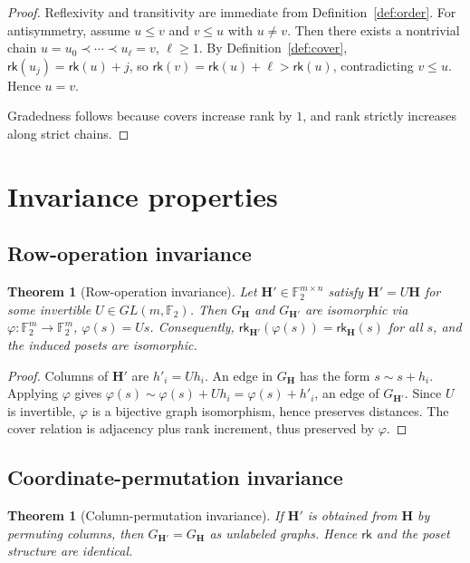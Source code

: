 \documentclass[11pt,twoside,leqno]{article}
\theoremstyle{definition}
\theoremstyle{plain}
\newtheorem{theorem}[definition]{Theorem}
\theoremstyle{remark}
\newcommand{\Ftwo}{\mathbb{F}_2}
\newcommand{\rk}{\mathsf{rk}}
\newcommand{\HH}{\mathbf{H}}
\begin{document}
\begin{proof}
Reflexivity and transitivity are immediate from Definition~\ref{def:order}.
For antisymmetry, assume $u\le v$ and $v\le u$ with $u\neq v$.
Then there exists a nontrivial chain $u=u_0\prec\cdots\prec u_\ell=v$, $\ell\ge 1$.
By Definition~\ref{def:cover}, $\rk(u_j)=\rk(u)+j$, so $\rk(v)=\rk(u)+\ell>\rk(u)$, contradicting $v\le u$.
Hence $u=v$.

Gradedness follows because covers increase rank by $1$, and rank strictly increases along strict chains.
\end{proof}

\section{Invariance properties}\label{sec:invariance}

\subsection{Row-operation invariance}
\begin{theorem}[Row-operation invariance]\label{thm:rowinv}
Let $\HH'\in\Ftwo^{m\times n}$ satisfy $\HH'=U\HH$ for some invertible $U\in GL(m,\Ftwo)$.
Then $G_{\HH}$ and $G_{\HH'}$ are isomorphic via $\varphi:\Ftwo^m\to\Ftwo^m$, $\varphi(s)=Us$.
Consequently, $\rk_{\HH'}(\varphi(s))=\rk_{\HH}(s)$ for all $s$, and the induced posets are isomorphic.
\end{theorem}

\begin{proof}
Columns of $\HH'$ are $h'_i=Uh_i$. An edge in $G_\HH$ has the form $s\sim s+h_i$.
Applying $\varphi$ gives $\varphi(s)\sim \varphi(s)+Uh_i=\varphi(s)+h'_i$, an edge of $G_{\HH'}$.
Since $U$ is invertible, $\varphi$ is a bijective graph isomorphism, hence preserves distances.
The cover relation is adjacency plus rank increment, thus preserved by $\varphi$.
\end{proof}

\subsection{Coordinate-permutation invariance}
\begin{theorem}[Column-permutation invariance]\label{thm:colperm}
If $\HH'$ is obtained from $\HH$ by permuting columns, then $G_{\HH'}=G_{\HH}$ as unlabeled graphs.
Hence $\rk$ and the poset structure are identical.
\end{theorem}
\end{document}
